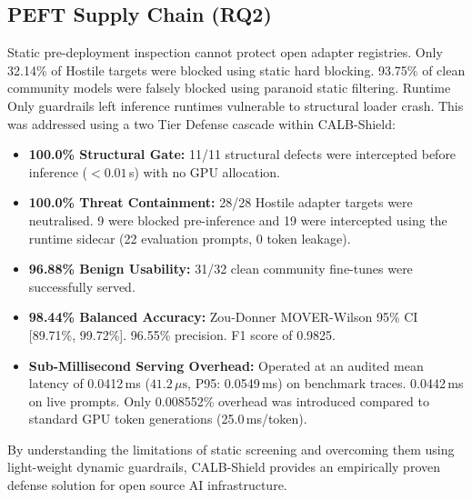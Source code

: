 \documentclass[conference]{IEEEtran}
\begin{document}
\subsection{PEFT Supply Chain (RQ2)}
Static pre-deployment inspection cannot protect open adapter registries. Only 32.14\% of Hostile targets were blocked using static hard blocking. 93.75\% of clean community models were falsely blocked using paranoid static filtering. Runtime Only guardrails left inference runtimes vulnerable to structural loader crash. This was addressed using a two Tier Defense cascade within CALB-Shield:
\begin{itemize}
    \item \textbf{100.0\% Structural Gate:} 11/11 structural defects were intercepted before inference ($< 0.01$\,s) with no GPU allocation.
    \item \textbf{100.0\% Threat Containment:} 28/28 Hostile adapter targets were neutralised. 9 were blocked pre-inference and 19 were intercepted using the runtime sidecar (22 evaluation prompts, 0 token leakage).
    \item \textbf{96.88\% Benign Usability:} 31/32 clean community fine-tunes were successfully served.
    \item \textbf{98.44\% Balanced Accuracy:} Zou-Donner MOVER-Wilson 95\% CI [89.71\%, 99.72\%]. 96.55\% precision. F1 score of 0.9825.
    \item \textbf{Sub-Millisecond Serving Overhead:} Operated at an audited mean latency of 0.0412\,ms ($41.2\,\mu\text{s}$, P95: 0.0549\,ms) on benchmark traces. 0.0442\,ms on live prompts. Only 0.008552\% overhead was introduced compared to standard GPU token generations (25.0\,ms/token).
\end{itemize}

By understanding the limitations of static screening and overcoming them using light-weight dynamic guardrails, CALB-Shield provides an empirically proven defense solution for open source AI infrastructure.

\balance
\FloatBarrier


\end{document}
